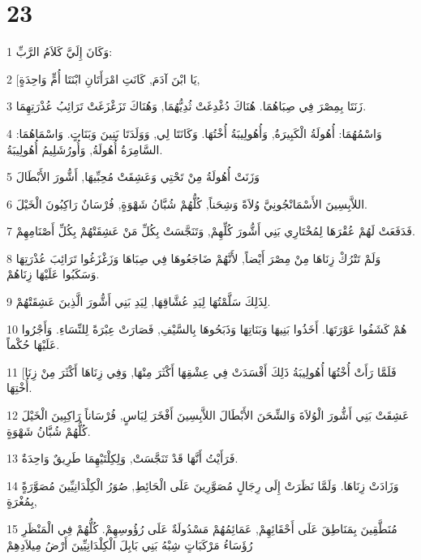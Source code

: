 \chapter{23}

\par 1 وَكَانَ إِلَيَّ كَلاَمُ الرَّبِّ:
\par 2 [يَا ابْنَ آدَمَ, كَانَتِ امْرَأَتَانِ ابْنَتَا أُمٍّ وَاحِدَةٍ,
\par 3 زَنَتَا بِمِصْرَ فِي صِبَاهُمَا. هُنَاكَ دُغْدِغَتْ ثُدِيُّهُمَا, وَهُنَاكَ تَزَغْزَغَتْ تَرَائِبُ عُذْرَتِهِمَا.
\par 4 وَاسْمُهُمَا: أُهُولَةُ الْكَبِيرَةُ, وَأُهُولِيبَةُ أُخْتُهَا. وَكَانَتَا لِي, وَوَلَدَتَا بَنِينَ وَبَنَاتٍ. وَاسْمَاهُمَا: السَّامِرَةُ أُهُولَةُ, وَأُورُشَلِيمُ أُهُولِيبَةُ.
\par 5 وَزَنَتْ أُهُولَةُ مِنْ تَحْتِي وَعَشِقَتْ مُحِبِّيهَا, أَشُّورَ الأَبْطَالَ
\par 6 اللاَّبِسِينَ الأَسْمَانْجُونِيَّ وُلاَةً وَشِحَناً, كُلُّهُمْ شُبَّانُ شَهْوَةٍ, فُرْسَانٌ رَاكِبُونَ الْخَيْلَ.
\par 7 فَدَفَعَتْ لَهُمْ عُقْرَهَا لِمُخْتَارِي بَنِي أَشُّورَ كُلِّهِمْ, وَتَنَجَّسَتْ بِكُلِّ مَنْ عَشِقَتْهُمْ بِكُلِّ أَصْنَامِهِمْ.
\par 8 وَلَمْ تَتْرُكْ زِنَاهَا مِنْ مِصْرَ أَيْضاً, لأَنَّهُمْ ضَاجَعُوهَا فِي صِبَاهَا وَزَغْزَغُوا تَرَائِبَ عُذْرَتِهَا وَسَكَبُوا عَلَيْهَا زِنَاهُمْ.
\par 9 لِذَلِكَ سَلَّمْتُهَا لِيَدِ عُشَّاقِهَا, لِيَدِ بَنِي أَشُّورَ الَّذِينَ عَشِقَتْهُمْ.
\par 10 هُمْ كَشَفُوا عَوْرَتَهَا. أَخَذُوا بَنِيهَا وَبَنَاتِهَا وَذَبَحُوهَا بِالسَّيْفِ, فَصَارَتْ عِبْرَةً لِلنِّسَاءِ. وَأَجْرُوا عَلَيْهَا حُكْماً.
\par 11 [فَلَمَّا رَأَتْ أُخْتُهَا أُهُولِيبَةُ ذَلِكَ أَفْسَدَتْ فِي عِشْقِهَا أَكْثَرَ مِنْهَا, وَفِي زِنَاهَا أَكْثَرَ مِنْ زِنَا أُخْتِهَا.
\par 12 عَشِقَتْ بَنِي أَشُّورَ الْوُلاَةَ وَالشِّحَنَ الأَبْطَالَ اللاَّبِسِينَ أَفْخَرَ لِبَاسٍ, فُرْسَاناً رَاكِبِينَ الْخَيْلَ كُلُّهُمْ شُبَّانُ شَهْوَةٍ.
\par 13 فَرَأَيْتُ أَنَّهَا قَدْ تَنَجَّسَتْ, وَلِكِلْتَيْهِمَا طَرِيقٌ وَاحِدَةٌ.
\par 14 وَزَادَتْ زِنَاهَا. وَلَمَّا نَظَرَتْ إِلَى رِجَالٍ مُصَوَّرِينَ عَلَى الْحَائِطِ, صُوَرُ الْكِلْدَانِيِّينَ مُصَوَّرَةًٍ بِمُغْرَةٍ,
\par 15 مُنَطَّقِينَ بِمَنَاطِقَ عَلَى أَحْقَائِهِمْ, عَمَائِمُهُمْ مَسْدُولَةٌ عَلَى رُؤُوسِهِمْ. كُلُّهُمْ فِي الْمَنْظَرِ رُؤَسَاءُ مَرْكَبَاتٍ شِبْهُ بَنِي بَابِلَ الْكِلْدَانِيِّينَ أَرْضُ مِيلاَدِهِمْ

